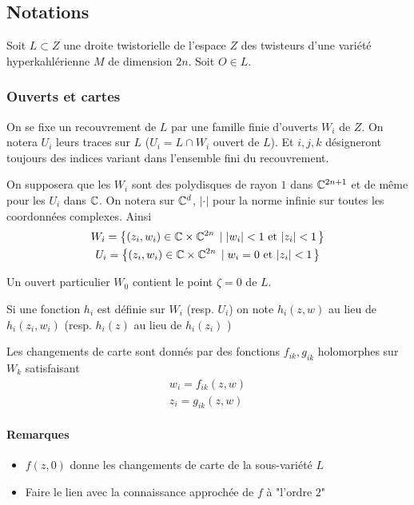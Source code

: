 \documentclass[a4paper,11pt,draft,makeidx,twocolumn]{amsart}
\begin{document}
\subsection{Notations}
Soit $L \subset Z$ une droite twistorielle de l'espace $Z$ des twisteurs d'une variété hyperkahlérienne $M$ de dimension $2n$. Soit $O \in L$. 
\subsubsection{Ouverts et cartes}
On se fixe un recouvrement de $L$ par une famille finie d'ouverts $W_i$ de $Z$. On notera $U_i$ leurs traces sur $L$ ($U_i = L \cap W_i$ ouvert de $L$). Et $i,j,k$ désigneront toujours des indices variant dans l'ensemble fini du recouvrement.

On supposera que les $W_i$ sont des polydisques de rayon $1$ dans $\mathbb{C}^{2n+1}$ et de même pour les $U_i$ dans $\mathbb{C}$.
On notera sur $\mathbb{C}^d$, $\vert \cdot \vert$ pour la norme infinie sur toutes les coordonnées complexes. Ainsi
\begin{subequations}
\begin{gather}
W_i = \left\lbrace { (z_i,w_i) \in \mathbb{C}\times \mathbb{C}^{2n}} \; \left| \; {|w_i| < 1 \text{ et } |z_i|<1} \right. \right\rbrace\\
U_i = \left\lbrace {(z_i,w_i) \in \mathbb{C}\times \mathbb{C}^{2n}} \; \left| \; {w_i = 0 \text{ et } |z_i|<1} \right. \right\rbrace
\end{gather}
\end{subequations}


Un ouvert particulier $W_0$ contient le point $\zeta = 0$ de $L$.

Si une fonction $h_i$ est définie sur $W_i$ (resp. $U_i$) on note $h_i(z,w)$ au lieu de $h_i(z_i,w_i)$ (resp. $h_i(z)$ au lieu de $h_i(z_i)$ )


Les changements de carte sont donnés par des fonctions $f_{ik},g_{ik}$ holomorphes sur $W_k$ satisfaisant
\begin{subequations}
\begin{gather}
w_i = f_{ik}(z,w)\\
z_i = g_{ik}(z,w)
\end{gather}
\end{subequations}
\paragraph{Remarques}
\begin{itemize}
\item $f(z,0)$ donne les changements de carte de la sous-variété $L$
\item Faire le lien avec la connaissance approchée de $f$ à "l'ordre $2$" \excl
\end{itemize}
\end{document}
